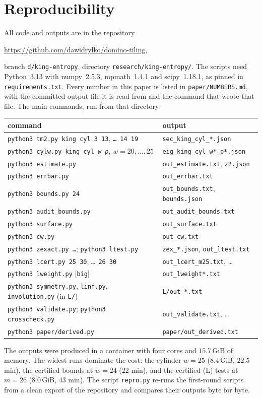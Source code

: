 \documentclass[11pt]{amsart}
\theoremstyle{definition}
\theoremstyle{remark}
\newcommand{\file}[1]{\texttt{#1}}
\begin{document}
\section{Reproducibility}\label{sec:repro}
All code and outputs are in the repository
\begin{center}
\url{https://github.com/dawidrylko/domino-tiling},
\end{center}
branch \texttt{d/king-entropy}, directory \texttt{research/king-entropy/}. The scripts need
Python~3.13 with numpy~2.5.3, mpmath~1.4.1 and scipy~1.18.1, as pinned in
\file{requirements.txt}. Every number in this paper is listed in \file{paper/NUMBERS.md},
with the committed output file it is read from and the command that wrote that file. The main commands, run from that directory:
\begin{center}
\begin{tabular}{ll}
\toprule
command & output \\
\midrule
\texttt{python3 tm2.py king cyl 3 13}, \texttt{\dots\ 14 19} & \file{sec\_king\_cyl\_*.json} \\
\texttt{python3 cylw.py king cyl \textit{w} \textit{p}}, $w = 20, \dots, 25$ & \file{eig\_king\_cyl\_w*\_p*.json} \\
\texttt{python3 estimate.py} & \file{out\_estimate.txt}, \file{z2.json} \\
\texttt{python3 errbar.py} & \file{out\_errbar.txt} \\
\texttt{python3 bounds.py 24} & \file{out\_bounds.txt}, \file{bounds.json} \\
\texttt{python3 audit\_bounds.py} & \file{out\_audit\_bounds.txt} \\
\texttt{python3 surface.py} & \file{out\_surface.txt} \\
\texttt{python3 cw.py} & \file{out\_cw.txt} \\
\texttt{python3 zexact.py \dots}; \texttt{python3 ltest.py} & \file{zex\_*.json}, \file{out\_ltest.txt} \\
\texttt{python3 lcert.py 25 30}, \texttt{\dots\ 26 30} & \file{out\_lcert\_m25.txt}, \dots \\
\texttt{python3 lweight.py} [\texttt{big}] & \file{out\_lweight*.txt} \\
\texttt{python3 symmetry.py}, \texttt{linf.py}, \texttt{involution.py} (in \file{L/}) & \file{L/out\_*.txt} \\
\texttt{python3 validate.py}; \texttt{python3 crosscheck.py} & \file{out\_validate.txt}, \dots \\
\texttt{python3 paper/derived.py} & \file{paper/out\_derived.txt} \\
\bottomrule
\end{tabular}
\end{center}
The outputs were produced in a container with four cores and $15.7$\,GiB of memory. The widest
runs dominate the cost: the cylinder $w = 25$ ($8.4$\,GiB, $22.5$ min), the certified bounds at
$w = 24$ ($22$ min), and the certified (L) tests at $m = 26$ ($8.0$\,GiB, $43$ min). The script
\file{repro.py} re-runs the first-round scripts from a clean export of the repository and
compares their outputs byte for byte.
\end{document}
